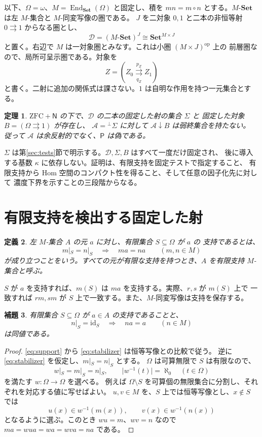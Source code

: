 \documentclass[a4paper,11pt]{ltjsarticle}
\theoremstyle{japaneseplain}
\newtheorem{theorem}{定理}[section]
\newtheorem{lemma}[theorem]{補題}
\newtheorem{definition}[theorem]{定義}
\newcommand{\Set}{\mathbf{Set}}
\newcommand{\MSet}{M\text{-}\Set}
\newcommand{\D}{\mathcal D}
\newcommand{\A}{\mathcal A}
\newcommand{\Naxiom}{\mathsf N}
\newcommand{\Pstmt}{\mathsf P}
\newcommand{\id}{\mathrm{id}}
\newcommand{\End}{\operatorname{End}}
\newcommand{\op}{\mathrm{op}}
\newcommand{\pairarrows}[2]{\mathrel{\mathop{\rightrightarrows}\limits^{#1}_{#2}}}
\newcommand{\coorth}[1]{{}^{\perp}\!#1}
\begin{document}
以下、$\Omega=\omega$、$M=\End_{\Set}(\Omega)$ と固定し、積を
$mn=m\circ n$ とする。$\MSet$ は左 $M$-集合と $M$-同変写像の圏である。
$J$ を二対象 $0,1$ と二本の非恒等射 $0\rightrightarrows1$ からなる圏とし、
\[
 \D=(\MSet)^J\cong\Set^{M\times J}
\]
と置く。右辺で $M$ は一対象圏とみなす。これは小圏 $(M\times J)^{\op}$ 上の
前層圏なので、局所可呈示圏である。対象を
\[
 Z=(Z_0\pairarrows{p_Z}{q_Z}Z_1)
\]
と書く。二射に追加の関係式は課さない。$1$ は自明な作用を持つ一元集合とする。

\begin{theorem}\label{thm:main}
$\mathrm{ZFC}+\Naxiom$ の下で、$\D$ の二本の固定した射の集合 $\Sigma$ と
固定した対象 $B=(\Omega\rightrightarrows1)$ が存在し、
$\A=\coorth{\Sigma}$ に対して $\A\mathbin{\downarrow}B$ は弱終集合を持たない。
従って $\A$ は余反射的でなく、$\Pstmt$ は偽である。
\end{theorem}

$\Sigma$ は第\ref{sec:tests}節で明示する。$\D,\Sigma,B$ はすべて一度だけ固定され、
後に導入する基数 $\kappa$ に依存しない。証明は、有限支持を固定テストで指定すること、
有限支持から Hom 空間のコンパクト性を得ること、そして任意の因子化先に対して
濃度下界を示すことの三段階からなる。

\section{有限支持を検出する固定した射}\label{sec:support}

\begin{definition}\label{def:support}
左 $M$-集合 $A$ の元 $a$ に対し、有限集合 $S\subseteq\Omega$ が $a$ の
\emph{支持}であるとは、
\begin{equation}\label{eq:support}
 m|_S=n|_S\quad\Longrightarrow\quad ma=na
 \qquad(m,n\in M)
\end{equation}
が成り立つことをいう。すべての元が有限な支持を持つとき、$A$ を有限支持 $M$-集合と呼ぶ。
\end{definition}

$S$ が $a$ を支持すれば、$m(S)$ は $ma$ を支持する。実際、$r,s$ が $m(S)$ 上で
一致すれば $rm,sm$ が $S$ 上で一致する。また、$M$-同変写像は支持を保存する。

\begin{lemma}\label{lem:stabilizer}
有限集合 $S\subseteq\Omega$ が $a\in A$ の支持であることと、
\begin{equation}\label{eq:stabilizer}
 n|_S=\id_S\quad\Longrightarrow\quad na=a
 \qquad(n\in M)
\end{equation}
は同値である。
\end{lemma}
\begin{proof}
\eqref{eq:support} から \eqref{eq:stabilizer} は恒等写像との比較で従う。
逆に \eqref{eq:stabilizer} を仮定し、$m|_S=n|_S$ とする。
$\Omega$ は可算無限で $S$ は有限なので、
\[
 w|_S=m|_S=n|_S,\qquad |w^{-1}(t)|=\aleph_0\quad(t\in\Omega)
\]
を満たす $w:\Omega\to\Omega$ を選べる。
例えば $\Omega\setminus S$ を可算個の無限集合に分割し、それぞれを対応する値に写せばよい。
$u,v\in M$ を、$S$ 上では恒等写像とし、$x\notin S$ では
\[
 u(x)\in w^{-1}(m(x)),\qquad v(x)\in w^{-1}(n(x))
\]
となるように選ぶ。このとき $wu=m$、$wv=n$ なので
$ma=wua=wa=wva=na$ である。
\end{proof}
\end{document}
